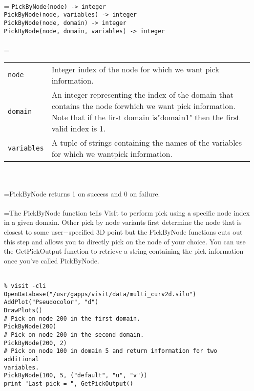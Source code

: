 \documentclass[10pt,a4paper]{report}
\begin{document}
 \\ 
\hangindent=\parindent 
\verb!PickByNode(node) -> integer!\\ 
\verb!PickByNode(node, variables) -> integer!\\ 
\verb!PickByNode(node, domain) -> integer!\\ 
\verb!PickByNode(node, domain, variables) -> integer!\\ [-3mm]

 \\ 
\hangindent=\parindent 
\begin{tabular}{lp{9cm}}
\verb!node! & Integer index of the node for which we want pick information. \\
\verb!domain! & An integer representing the index of the domain that contains the node forwhich we want pick information. Note that if the first domain is"domain1" then the first valid index is 1. \\
\verb!variables! & A tuple of strings containing the names of the variables for which we wantpick information. \\
\end{tabular} \\[-2mm]


 \\ 
\hangindent=\parindent PickByNode returns 1 on success and 0 on failure. \\[-3mm] 

 \\ 
\hangindent=\parindent The PickByNode function tells VisIt to perform pick using a specific node index in a given domain. Other pick by node variants first determine the node that is closest to some user$-$specified 3D point but the PickByNode functions cuts out this step and allows you to directly pick on the node of your choice. You can use the GetPickOutput function to retrieve a string containing the pick information once you've called PickByNode. \\[-3mm] 

\\[-6mm]
\begin{verbatim}% visit -cli
OpenDatabase("/usr/gapps/visit/data/multi_curv2d.silo")
AddPlot("Pseudocolor", "d")
DrawPlots()
# Pick on node 200 in the first domain.
PickByNode(200)
# Pick on node 200 in the second domain.
PickByNode(200, 2)
# Pick on node 100 in domain 5 and return information for two additional
variables.
PickByNode(100, 5, ("default", "u", "v"))
print "Last pick = ", GetPickOutput()
\end{verbatim}
\newpage
\end{document}
